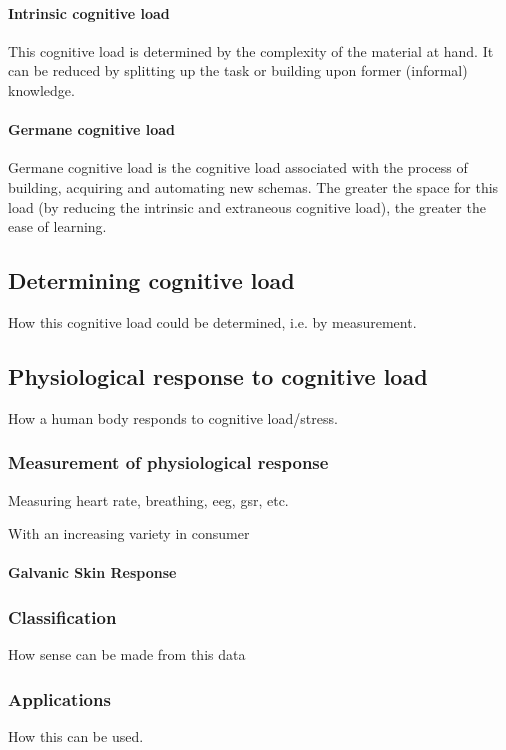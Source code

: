 \documentclass[12pt,fleqn,leqno,letterpaper]{article}
\begin{document}
\paragraph{Intrinsic cognitive load}
This cognitive load is determined by the complexity of the material at hand. It can be reduced by splitting up the task or building upon former (informal) knowledge.

\paragraph{Germane cognitive load}
Germane cognitive load is the cognitive load associated with the process of building, acquiring and automating new schemas. The greater the space for this load (by reducing the intrinsic and extraneous cognitive load), the greater the ease of learning.




\subsection{Determining cognitive load}
How this cognitive load could be determined, i.e. by measurement.

\subsection{Physiological response to cognitive load}
How a human body responds to cognitive load/stress. 


\subsubsection{Measurement of physiological response}
Measuring heart rate, breathing, eeg, gsr, etc.

With an increasing variety in consumer 

\paragraph{Galvanic Skin Response}


\subsubsection{Classification}
How sense can be made from this data

\subsubsection{Applications}
How this can be used.
\end{document}
